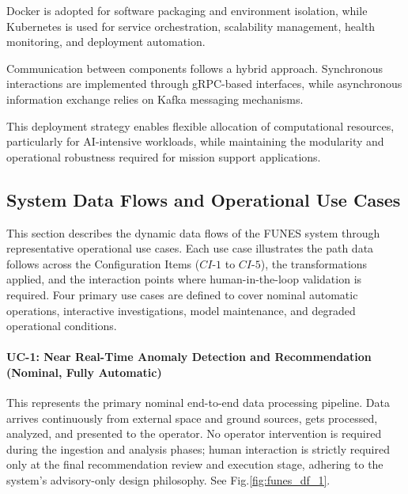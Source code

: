 Docker is adopted for software packaging and environment isolation, while Kubernetes is used for service orchestration, scalability management, health monitoring, and deployment automation.

Communication between components follows a hybrid approach. Synchronous interactions are implemented through gRPC-based interfaces, while asynchronous information exchange relies on Kafka messaging mechanisms.

This deployment strategy enables flexible allocation of computational resources, particularly for AI-intensive workloads, while maintaining the modularity and operational robustness required for mission support applications.


\subsection{System Data Flows and Operational Use Cases} \label{sec:data_flows}

This section describes the dynamic data flows of the FUNES system through representative operational use cases. Each use case illustrates the path data follows across the Configuration Items ($CI\text{-}1$ to $CI\text{-}5$), the transformations applied, and the interaction points where human-in-the-loop validation is required. Four primary use cases are defined to cover nominal automatic operations, interactive investigations, model maintenance, and degraded operational conditions.

\paragraph{UC-1: Near Real-Time Anomaly Detection and Recommendation (Nominal, Fully Automatic)}
This represents the primary nominal end-to-end data processing pipeline. Data arrives continuously from external space and ground sources, gets processed, analyzed, and presented to the operator. No operator intervention is required during the ingestion and analysis phases; human interaction is strictly required only at the final recommendation review and execution stage, adhering to the system's advisory-only design philosophy. See Fig.\ref{fig:funes_df_1}.


